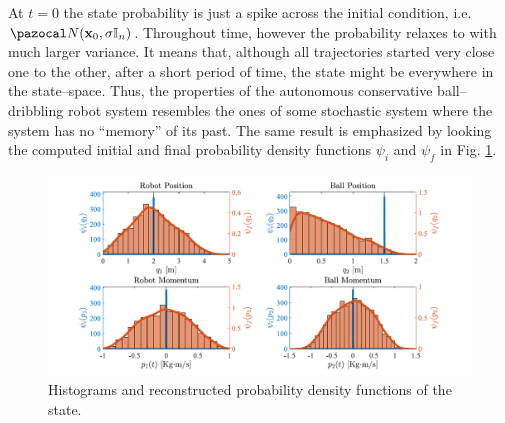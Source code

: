%
At $t=0$ the state probability is just a spike across the initial condition, i.e. $\N(\xb_0,\sigma\mathbb{I}_n)$. Throughout time, however the probability relaxes to with much larger variance. It means that, although all trajectories started very close one to the other, after a short period of time, the state might be everywhere in the state--space. Thus, the properties of the autonomous conservative ball--dribbling robot system resembles the ones of some stochastic system where the system has no ``memory'' of its past.
The same result is emphasized by looking the computed initial and final probability density functions $\psi_i$ and $\psi_f$ in Fig. \ref{fig:hist}.
%
\begin{figure}[!ht]
    \centering
    \includegraphics[width = 1\linewidth]{Figures/Hist.pdf}
    \caption{Histograms and reconstructed probability density functions of the state.}
    \label{fig:hist}
\end{figure}
%
\clearpage
